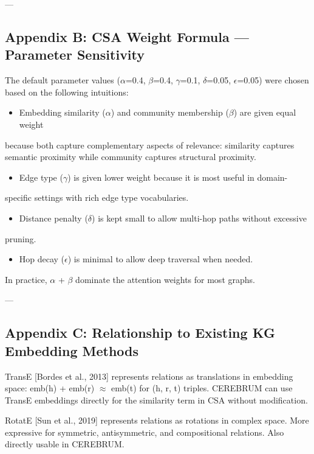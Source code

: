\documentclass[10pt,journal,compsoc]{IEEEtran}
\begin{document}
---

\subsection{Appendix B: CSA Weight Formula — Parameter Sensitivity}

The default parameter values ($\alpha$=0.4, $\beta$=0.4, $\gamma$=0.1, $\delta$=0.05, $\epsilon$=0.05) were
chosen based on the following intuitions:

\begin{itemize}
\item Embedding similarity ($\alpha$) and community membership ($\beta$) are given equal weight
\end{itemize}
  because both capture compl\-ementary aspects of relevance: similarity captures
  semantic proximity while community captures structural proximity.
\begin{itemize}
\item Edge type ($\gamma$) is given lower weight because it is most useful in domain-
\end{itemize}
  specific settings with rich edge type vocab\-ularies.
\begin{itemize}
\item Distance penalty ($\delta$) is kept small to allow multi-hop paths without excessive
\end{itemize}
  pruning.
\begin{itemize}
\item Hop decay ($\epsilon$) is minimal to allow deep traversal when needed.

\end{itemize}
In practice, $\alpha$ + $\beta$ dominate the attention weights for most graphs.

---

\subsection{Appendix C: Relati\-onship to Existing KG Embedding Methods}

TransE [Bordes et al., 2013] represents relations as trans\-lations in embedding
space: emb(h) + emb(r) $\approx$ emb(t) for (h, r, t) triples. CEREBRUM can use
TransE embeddings directly for the similarity term in CSA without modif\-ication.

RotatE [Sun et al., 2019] represents relations as rotations in complex space.
More expressive for symmetric, antis\-ymmetric, and compo\-sitional relations.
Also directly usable in CEREBRUM.
\end{document}
